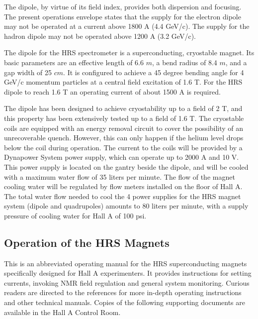 The dipole, by virtue of its field index, provides both
dispersion and focusing.  The present operations envelope 
states that the supply for the electron dipole may not be
operated at a current above 1800 A (4.4 GeV/c). The supply for the hadron
dipole may not be operated above 1200 A (3.2 GeV/c). 

The dipole for the HRS spectrometer is a superconducting, cryostable 
magnet.  Its basic parameters are an effective length of 6.6 $m$, a 
bend radius of 8.4 $m$, and a gap width of 25 $cm$.  It is configured to 
achieve a 45 degree bending angle for 4 GeV/c momentum particles at a 
central field excitation of 1.6 T.  For the HRS dipole to reach 1.6 T 
an operating current of about 1500 A is required.

The dipole has been designed to achieve cryostability up to a field of 2 
T, and this property has been extensively tested up to a field of 1.6 T. 
 The cryostable coils are equipped with an energy removal circuit to 
cover the possibility of an unrecoverable quench.  However, this can 
only happen if the helium level drops below the coil during operation.  
The current to the coils will be provided by a Dynapower System power 
supply, which can operate up to 2000 A and 10 V.  This 
power supply is located on the gantry beside the dipole, and will be 
cooled with a maximum water flow of 35 liters per minute.  The flow of 
the magnet cooling water will be regulated by flow meters installed on 
the floor of Hall A.  The total water flow needed to cool the 4 power 
supplies for the HRS magnet system (dipole and quadrupoles) amounts to 
80 liters per minute, with a supply pressure of cooling water for Hall A 
of 100 psi.

\subsection{Operation of the HRS Magnets}


This is an abbreviated operating manual for 
the HRS superconducting magnets specifically designed for Hall A 
experimenters.  It provides instructions for setting currents, invoking 
NMR field regulation and general system monitoring.  Curious readers are 
directed to the references for more in-depth operating instructions and 
other technical manuals. Copies of the following supporting
documents are available in the Hall A Control Room.

